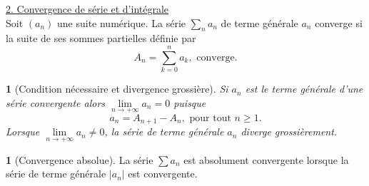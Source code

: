 \documentclass[8pt,notheorems]{beamer}
\newtheorem{prop}{\translate{Proposition}}
\theoremstyle{definition}
\newtheorem{definition}{\translate{Definition}}
\theoremstyle{example}
\theoremstyle{mystyle}
\theoremstyle{plain}
\begin{document}
\begin{frame}[allowframebreaks]
\underline{2. Convergence de série et d'intégrale}\\
Soit $(a_n)$ une suite numérique. La série $\sum_n a_n$ de terme générale $a_n$ converge si la suite de ses sommes partielles définie par
$$
A_n = \sum_{k = 0}^{n}a_k,\text{  converge}.
$$
\begin{prop}[Condition nécessaire et divergence grossière]
Si $a_n$ est le terme générale d'une série convergente alors
$\underset{n\rightarrow +\infty}{\lim}a_n =0$
puisque
$$
a_n = A_{n+1}-A_n,\text{ pour tout }n\geq1.
$$
Lorsque $\underset{n\rightarrow +\infty}{\lim} a_n\neq 0$, la série de terme générale $a_n$ diverge grossièrement.
\end{prop}
\begin{definition}[Convergence absolue]
La série $\sum a_n$ est absolument convergente lorsque la série de terme générale $|a_n|$ est convergente.
\end{definition}
\end{frame}
\end{document}
